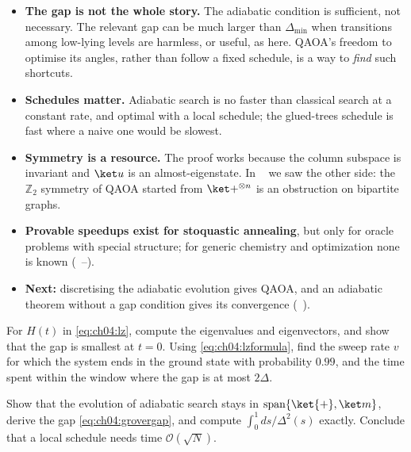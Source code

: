 \documentclass[handoutsbeamer.tex]{subfiles}
\begin{document}
\begin{frame}
\onp{\footnotesize}
\begin{itemize}\setlength\itemsep{0.35em}
    \item \textbf{The gap is not the whole story.} The adiabatic condition is sufficient, not necessary. The relevant gap can be much larger than $\Delta_{\min}$ when transitions among low-lying levels are harmless, or useful, as here. QAOA's freedom to optimise its angles, rather than follow a fixed schedule, is a way to \emph{find} such shortcuts.
    \item \textbf{Schedules matter.} Adiabatic search is no faster than classical search at a constant rate, and optimal with a local schedule; the glued-trees schedule is fast where a naive one would be slowest.
    \item \textbf{Symmetry is a resource.} The proof works because the column subspace is invariant and $\ket u$ is an almost-eigenstate. In \Chap~ we saw the other side: the $\mathbb Z_2$ symmetry of QAOA started from $\ket+^{\otimes n}$ is an obstruction on bipartite graphs.
    \item \textbf{Provable speedups exist for stoquastic annealing}, but only for oracle problems with special structure; for generic chemistry and optimization none is known (\Chaps~--).
    \item \textbf{Next:} discretising the adiabatic evolution gives QAOA, and an adiabatic theorem without a gap condition gives its convergence (\Chap~).
\end{itemize}
\end{frame}

\begin{frame}
\begin{exe}
For $H(t)$ in \eqref{eq:ch04:lz}, compute the eigenvalues and eigenvectors, and show that the gap is smallest at $t = 0$. Using \eqref{eq:ch04:lzformula}, find the sweep rate $v$ for which the system ends in the ground state with probability $0.99$, and the time spent within the window where the gap is at most $2\Delta$.
\end{exe}
\begin{exe}
Show that the evolution of adiabatic search stays in $\spn\{\ket{+}, \ket m\}$, derive the gap \eqref{eq:ch04:grovergap}, and compute $\int_0^1 ds/\Delta^2(s)$ exactly. Conclude that a local schedule needs time $\mathcal O(\sqrt N)$.
\end{exe}
\end{frame}
\end{document}
